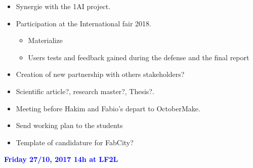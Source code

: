 \begin{tcolorbox}
\begin{itemize}
	\item Synergie with the 1AI project.
	\item Participation at the International fair 2018.

		\begin{itemize}
			\item Materialize 
			\item Users tests and feedback gained during the defense and the final report			
		\end{itemize}

	\item Creation of new partnership with others stakeholders?
	\item Scientific article?, research master?, Thesis?.
	
\end{itemize}




	
	\begin{itemize}
		\item Meeting before Hakim and Fabio's depart to OctoberMake.
		\item Send working plan to the students
		\item Template of candidature for FabCity?
	\end{itemize}
	
	
	
	\textcolor{blue}{\textbf{Friday 27/10, 2017 14h at LF2L}}
	
\end{tcolorbox}









